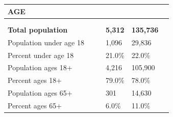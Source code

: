 \documentclass[9pt]{report}
\begin{document}
\vspace{24pt}
\setlength{\tabcolsep}{.01in} %
\begin{tabular}{p{.10in}p{.10in}p{.10in}p{3.7in}>{\hfill}p{.85in}>{\hfill}p{.85in}>{\hfill}p{.85in}>{\hfill}p{.85in}p{0.1in}}
\multicolumn{9}{l}{\parbox{7.1in}{\raggedright{\large{\strut\textbf{AGE}\strut}}}} \\ 
\hline
\multicolumn{4}{l}{\parbox{3.5in}{\raggedright{\textbf{}}}} & \multicolumn{1}{r}{\parbox{.85in}{\strut\raggedleft{\textbf{}\strut}}} & \multicolumn{1}{r}{\parbox{.85in}{\strut\raggedleft{\textbf{}\strut}}} & \multicolumn{1}{r}{\parbox{.85in}{\strut{}}} & \multicolumn{1}{r}{\parbox{.85in}{\strut{}}} & \\ 
\multicolumn{9}{l}{} \\ 
\multicolumn{4}{l}{\parbox{3.5in}{\strut\raggedright{\textbf{Total population}\strut}}} & \textbf{} & \textbf{} & \textbf{5,312} & \textbf{135,736} & \textbf{} \\ 
\multicolumn{4}{l}{\parbox{3.6in}{\strut\raggedright{{Population under age 18}}\strut}} &  &  & 1,096 & 29,836 & \multicolumn{1}{l}{}  \\ 
\multicolumn{4}{l}{\parbox{3.6in}{\strut\raggedright{{Percent under age 18}}\strut}} &  &  & 21.0\% & 22.0\% & \multicolumn{1}{l}{}  \\ 
\multicolumn{4}{l}{\parbox{3.6in}{\strut\raggedright{{Population ages 18+}}\strut}} &  &  & 4,216 & 105,900 & \multicolumn{1}{l}{}  \\ 
\multicolumn{4}{l}{\parbox{3.6in}{\strut\raggedright{{Percent ages 18+}}\strut}} &  &  & 79.0\% & 78.0\% & \multicolumn{1}{l}{}  \\ 
\multicolumn{4}{l}{\parbox{3.6in}{\strut\raggedright{{Population ages 65+}}\strut}} &  &  & 301 & 14,630 & \multicolumn{1}{l}{}  \\ 
\multicolumn{4}{l}{\parbox{3.6in}{\strut\raggedright{{Percent ages 65+}}\strut}} &  &  & 6.0\% & 11.0\% & \multicolumn{1}{l}{}  \\ 

\end{tabular}
\setlength{\tabcolsep}{6pt} %
\end{document}
